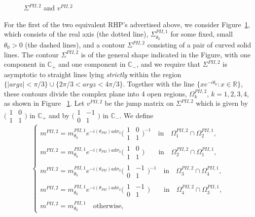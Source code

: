 \documentclass{amsart}
\theoremstyle{definition}
\theoremstyle{remark}
\numberwithin{equation}{section}
\newcommand{\C}{\mathbb C}
\newcommand{\R}{\mathbb R}
\begin{document}
\bigskip
\begin{figure}[ht]
 \centerline{}
 \caption{$\Sigma^{PII,2}$ and $v^{PII,2}$}\label{fig-PII2}
\end{figure}
For the first of the two equivalent RHP's advertised above, 
we consider Figure~\ref{fig-PII2}, which consists of 
the real axis (the dotted line), $\Sigma^{PII,1}_{\theta_0}$ for some 
fixed, small $\theta_0>0$ (the dashed lines), and a contour 
$\Sigma^{PII,2}$ consisting of a pair of curved solid lines. 
The contour $\Sigma^{PII,2}$ is of the general shape indicated 
in the Figure, with one component in $\C_+$ and one component in $\C_-$, 
and we require that $\Sigma^{PII,2}$ is asymptotic to straight lines 
lying \emph{strictly} within 
the region $\{ |arg z|<\pi/3 \}\cup\{ 2\pi/3 <arg z< 4\pi/3 \}$.
Together with the line $\{xe^{-i\theta_0} : x\in\R \}$, 
these contours divide 
the complex plane into 4 open regions, 
$\Omega^{PII,2}_k$, $k=1,2,3,4$, as shown in Figure ~\ref{fig-PII2}.
Let $v^{PII,2}$ be the jump matrix on $\Sigma^{PII,2}$ which is given by 
$\bigl(\begin{smallmatrix} 1&0\\1&1 \end{smallmatrix}\bigr)$ in $\C_+$ 
and by $\bigl(\begin{smallmatrix} 1&-1\\0&1 \end{smallmatrix}\bigr)$ in $\C_-$.
We define
\begin{equation*}
  \begin{cases}
    m^{PII,2}=m_{\theta_0}^{PII,1}e^{-i(\theta_{PII})ad\sigma_3}
\bigl(\begin{smallmatrix} 1&0\\1&1 \end{smallmatrix} \bigr)^{-1}
\quad\text{in}\quad{\Omega^{PII,2}_1\cap\Omega^{PII,1}_2},\\
    m^{PII,2}=m_{\theta_0}^{PII,1}e^{-i(\theta_{PII})ad\sigma_3}
\bigl(\begin{smallmatrix} 1&0\\1&1 \end{smallmatrix} \bigr)
\qquad\text{in}\quad{\Omega^{PII,2}_2\cap\Omega^{PII,1}_1},\\
    m^{PII,2}=m_{\theta_0}^{PII,1}e^{-i(\theta_{PII})ad\sigma_3}
\bigl(\begin{smallmatrix} 1&-1\\0&1 \end{smallmatrix} \bigr)^{-1}
\quad\text{in}\quad{\Omega^{PII,2}_3\cap\Omega^{PII,1}_4},\\
    m^{PII,2}=m_{\theta_0}^{PII,1}e^{-i(\theta_{PII})ad\sigma_3}
\bigl(\begin{smallmatrix} 1&-1\\0&1 \end{smallmatrix} \bigr)
\qquad\text{in}\quad{\Omega^{PII,2}_4\cap\Omega^{PII,1}_3},\\
    m^{PII,2}=m_{\theta_0}^{PII,1}\quad\text{otherwise},
  \end{cases}
\end{equation*}
\end{document}
